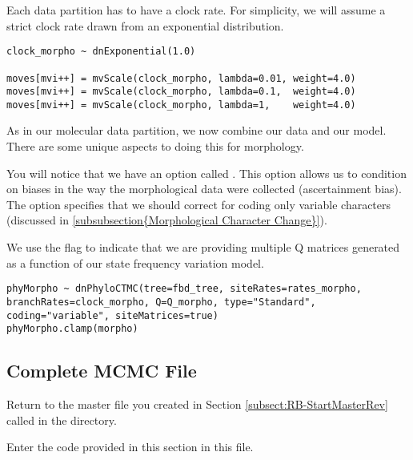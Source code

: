 Each data partition has to have a clock rate. For simplicity, we will assume a strict clock rate drawn from an exponential distribution.

{\tt \begin{snugshade*}
\begin{lstlisting}
clock_morpho ~ dnExponential(1.0)

moves[mvi++] = mvScale(clock_morpho, lambda=0.01, weight=4.0)
moves[mvi++] = mvScale(clock_morpho, lambda=0.1,  weight=4.0)
moves[mvi++] = mvScale(clock_morpho, lambda=1,    weight=4.0)
\end{lstlisting}
\end{snugshade*}}

As in our molecular data partition, we now combine our data and our model. There are some unique aspects to doing this for morphology. \par
You will notice that we have an option called . This option allows us to condition on biases in the way the morphological data were collected (ascertainment bias).
The option  specifies that we should correct for coding only variable characters (discussed in \ref{subsubsection{Morphological Character Change}}). \par

We use the flag  to indicate that we are providing multiple Q matrices generated as a function of our state frequency variation model. \par


{\tt \begin{snugshade*}
\begin{lstlisting}
phyMorpho ~ dnPhyloCTMC(tree=fbd_tree, siteRates=rates_morpho, branchRates=clock_morpho, Q=Q_morpho, type="Standard", coding="variable", siteMatrices=true)
phyMorpho.clamp(morpho)
\end{lstlisting}
\end{snugshade*}}


\bigskip

\subsection{Complete MCMC File}\label{subsect:RB-CompleteMCMC}

{\begin{framed}
Return to the master \Rev file you created in Section \ref{subsect:RB-StartMasterRev} called {\textcolor{red}{}} in the  directory.

Enter the \Rev code provided in this section in this file.
\end{framed}}

